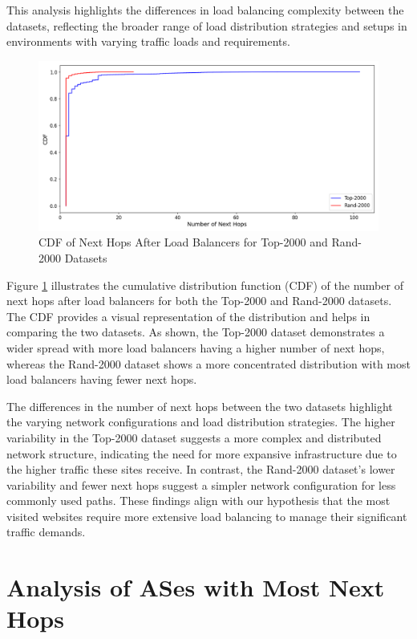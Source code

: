 \documentclass[12pt]{cwru_thesis}
\begin{document}
This analysis highlights the differences in load balancing complexity between the datasets, reflecting the broader range of load distribution strategies and setups in environments with varying traffic loads and requirements.

\begin{figure}[h]
    \centering
    \includegraphics[width=\linewidth]{figures/cdf_next_hops.png}
    \caption{CDF of Next Hops After Load Balancers for Top-2000 and Rand-2000 Datasets}
    \label{fig:cdf_next_hops}
\end{figure}

Figure \ref{fig:cdf_next_hops} illustrates the cumulative distribution function (CDF) of the number of next hops after load balancers for both the Top-2000 and Rand-2000 datasets. The CDF provides a visual representation of the distribution and helps in comparing the two datasets. As shown, the Top-2000 dataset demonstrates a wider spread with more load balancers having a higher number of next hops, whereas the Rand-2000 dataset shows a more concentrated distribution with most load balancers having fewer next hops.

The differences in the number of next hops between the two datasets highlight the varying network configurations and load distribution strategies. The higher variability in the Top-2000 dataset suggests a more complex and distributed network structure, indicating the need for more expansive infrastructure due to the higher traffic these sites receive. In contrast, the Rand-2000 dataset's lower variability and fewer next hops suggest a simpler network configuration for less commonly used paths. These findings align with our hypothesis that the most visited websites require more extensive load balancing to manage their significant traffic demands.

\section{Analysis of ASes with Most Next Hops}
\end{document}
